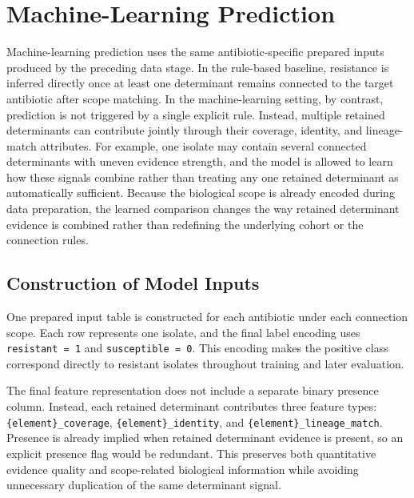 \section{Machine-Learning Prediction}

Machine-learning prediction uses the same antibiotic-specific prepared inputs produced by the preceding data stage. In the rule-based baseline, resistance is inferred directly once at least one determinant remains connected to the target antibiotic after scope matching. In the machine-learning setting, by contrast, prediction is not triggered by a single explicit rule. Instead, multiple retained determinants can contribute jointly through their coverage, identity, and lineage-match attributes. For example, one isolate may contain several connected determinants with uneven evidence strength, and the model is allowed to learn how these signals combine rather than treating any one retained determinant as automatically sufficient. Because the biological scope is already encoded during data preparation, the learned comparison changes the way retained determinant evidence is combined rather than redefining the underlying cohort or the connection rules.

\subsection{Construction of Model Inputs}

One prepared input table is constructed for each antibiotic under each connection scope. Each row represents one isolate, and the final label encoding uses \texttt{resistant = 1} and \texttt{susceptible = 0}. This encoding makes the positive class correspond directly to resistant isolates throughout training and later evaluation.

The final feature representation does not include a separate binary presence column. Instead, each retained determinant contributes three feature types: \texttt{\{element\}\_coverage}, \texttt{\{element\}\_identity}, and \texttt{\{element\}\_lineage\_match}. Presence is already implied when retained determinant evidence is present, so an explicit presence flag would be redundant. This preserves both quantitative evidence quality and scope-related biological information while avoiding unnecessary duplication of the same determinant signal.

